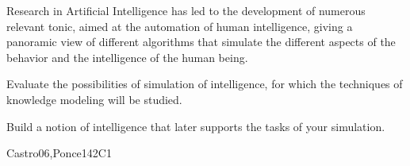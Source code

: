 \begin{syllabus}


\begin{justification}
Research in Artificial Intelligence has led to the development of numerous relevant tonic, aimed at the automation of human intelligence, giving a panoramic view of different
algorithms that simulate the different aspects of the behavior and the intelligence of the human being.
\end{justification}

\begin{goals}
\item Evaluate the possibilities of simulation of intelligence, for which the techniques of knowledge modeling will be studied.
\item Build a notion of intelligence that later supports the tasks of your simulation.
\end{goals}

\begin{outcomes}
  \item {}
  \item {}
  \item {}
  \item {}
\end{outcomes}

\begin{competences}
    \item {} 
    \item {}
    \item {}
\end{competences}

\begin{unit}{\ISFundamentalIssues}{}{Castro06,Ponce14}{2}{C1}
\begin{topics}
    \item \ISFundamentalIssuesTopicOverview
    \item \ISFundamentalIssuesTopicWhat
    \item \ISFundamentalIssuesTopicProblem
    \item \ISFundamentalIssuesTopicNature
    \item \ISFundamentalIssuesTopicPhilosophical
\end{topics}
\begin{learningoutcomes}
    \item \ISFundamentalIssuesLODescribeTuring [\Usage]
    \item \ISFundamentalIssuesLODeterming [\Usage]
\end{learningoutcomes}
\end{unit}


\end{syllabus}
